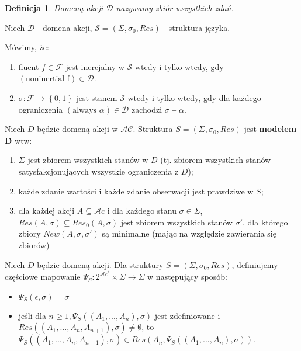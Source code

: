 \documentclass[11pt,a4paper]{article}
\newtheorem{defn}{Definicja}
\begin{document}
\begin{defn}
Domeną akcji $\mathcal{D}$ nazywamy zbiór wszystkich zdań.
\end{defn}

Niech $\mathcal{D}$ - domena akcji, $\mathcal{S} = \left(\Sigma, \sigma_0, Res\right)$ - struktura języka.

Mówimy, że:
\begin{enumerate}
    \item fluent $f \in \mathcal{F}$  jest inercjalny w $\mathcal{S}$ wtedy i tylko wtedy, gdy $\left(\text{noninertial f}\right) \in \mathcal{D}$.
    \item $\sigma : \mathcal{F} \rightarrow \left\{0,1\right\}$ jest stanem $\mathcal{S}$ wtedy i tylko wtedy, gdy dla każdego ograniczenia $\left(\text{always } \alpha\right) \in \mathcal{D}$ zachodzi $\sigma \models \alpha$.
\end{enumerate}






Niech $D$ będzie domeną akcji w $\mathcal{AC}$. Struktura $S = (\Sigma,\sigma_0,Res)$ jest \textbf{modelem D} wtw:
\begin{enumerate}
\item $\Sigma$ jest zbiorem wszystkich stanów w $D$ (tj. zbiorem wszystkich stanów satysfakcjonujących wszystkie ograniczenia z $D$);
\item każde zdanie wartości i każde zdanie obserwacji jest prawdziwe w $S$;
\item dla każdej akcji $A \subseteq \mathcal{A}c$ i dla każdego stanu $\sigma \in \Sigma$, $Res(A,\sigma) \subseteq Res_0(A,\sigma)$ jest zbiorem wszystkich stanów $\sigma'$, dla którego zbiory $New(A,\sigma,\sigma')$ są minimalne (mając na względzie zawierania się zbiorów)
\end{enumerate}


Niech $D$ będzie domeną akcji. Dla struktury $S = (\Sigma,\sigma_0,Res)$, definiujemy częściowe mapowanie 
$\Psi_S : 2^{\mathcal{A}c^*} \times \Sigma \rightarrow \Sigma$ w następujący sposób:
\begin{itemize}
\item $\Psi_S(\epsilon,\sigma) = \sigma$
\item jeśli dla $n \geq 1, \Psi_S((A_1,...,A_n),\sigma)$ jest zdefiniowane i $Res((A_1,...,A_n,A_{n+1}),\sigma) \neq \emptyset$, to $\Psi_S((A_1,...,A_n,A_{n+1}),\sigma) \in Res(A_n,\Psi_S((A_1,...,A_n),\sigma)).$
\end{itemize}
\end{document}
